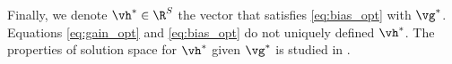 Finally, we denote $\vh^*\in\R^{S}$ the vector that satisfies \eqref{eq:bias_opt} with $\vg^*$.
Equations \eqref{eq:gain_opt} and \eqref{eq:bias_opt} do not uniquely defined $\vh^*$.
The properties of solution space for $\vh^*$ given $\vg^*$ is studied in \cite{schweitzer1978functional}.

\endgroup

